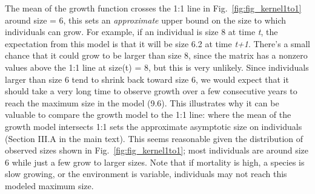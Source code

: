 \documentclass[11pt]{article}
\begin{document}
The mean of the growth function crosses the 1:1 line in Fig.~\ref{fig:fig_kernel1to1} around size = 6, this sets an \emph{approximate} upper bound on the size to which individuals can grow. For example, if an individual is size 8 at time \emph{t}, the expectation from this model is that it will be size 6.2 at time \emph{t+1}. There's a small chance that it could grow to be larger than size 8, since the matrix has a nonzero values above the 1:1 line at size(t) = 8, but this is very unlikely. Since individuals larger than size 6 tend to shrink back toward size 6, we would expect that it should take a very long time to observe growth over a few consecutive years to reach the maximum size in the model (9.6). This illustrates why it can be valuable to compare the growth model to the 1:1 line: where the mean of the growth model intersects 1:1 sets the approximate asymptotic size on individuals (Section III.A in the main text). This seems reasonable given the distribution of observed sizes shown in Fig.~\ref{fig:fig_kernel1to1}; most individuals are around size 6 while just a few grow to larger sizes. Note that if mortality is high, a species is slow growing, or the environment is variable, individuals may not reach this modeled maximum size.
\end{document}
